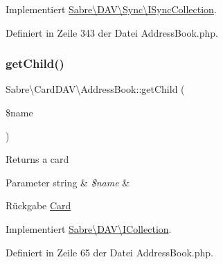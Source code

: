 Implementiert \mbox{\hyperlink{interface_sabre_1_1_d_a_v_1_1_sync_1_1_i_sync_collection_aa47423825bfcce42d78266f920393aed}{Sabre\textbackslash{}\+D\+A\+V\textbackslash{}\+Sync\textbackslash{}\+I\+Sync\+Collection}}.



Definiert in Zeile 343 der Datei Address\+Book.\+php.

\mbox{\label{class_sabre_1_1_card_d_a_v_1_1_address_book_aec8e795845ea7326b2fbe8198769e4cc}} 
\subsubsection{\texorpdfstring{get\+Child()}{getChild()}}
{\footnotesize\ttfamily Sabre\textbackslash{}\+Card\+D\+A\+V\textbackslash{}\+Address\+Book\+::get\+Child (\begin{DoxyParamCaption}\item[{}]{\$name }\end{DoxyParamCaption})}

Returns a card


\begin{DoxyParams}[1]{Parameter}
string & {\em \$name} & \\
\hline
\end{DoxyParams}
\begin{DoxyReturn}{Rückgabe}
\mbox{\hyperlink{class_sabre_1_1_card_d_a_v_1_1_card}{Card}} 
\end{DoxyReturn}


Implementiert \mbox{\hyperlink{interface_sabre_1_1_d_a_v_1_1_i_collection_a09f82b07550611752abb149f468b89c2}{Sabre\textbackslash{}\+D\+A\+V\textbackslash{}\+I\+Collection}}.



Definiert in Zeile 65 der Datei Address\+Book.\+php.

\mbox{\label{class_sabre_1_1_card_d_a_v_1_1_address_book_ab3e6477506aab37c658065d7a6fb6e3d}} 
